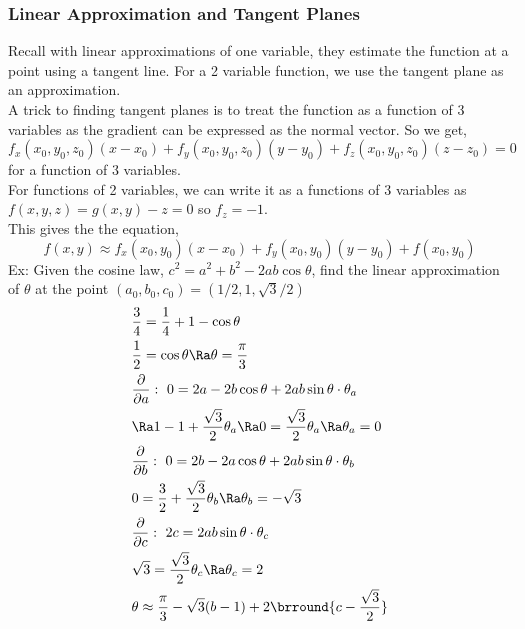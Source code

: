\subsubsection{Linear Approximation and Tangent Planes}
Recall with linear approximations of one variable, they estimate the function at a point using a tangent line. For a 2 variable function, we use the tangent plane as an approximation.\\
A trick to finding tangent planes is to treat the function as a function of 3 variables as the gradient can be expressed as the normal vector. So we get,
$$f_x(x_0,y_0,z_0)(x-x_0)+f_y(x_0,y_0,z_0)(y-y_0)+f_z(x_0,y_0,z_0)(z-z_0)=0$$
for a function of 3 variables.\\
For functions of 2 variables, we can write it as a functions of 3 variables as $f(x,y,z)=g(x,y)-z=0$ so $f_z=-1$.\\
This gives the the equation,
$$f(x,y)\approx f_x(x_0,y_0)(x-x_0)+f_y(x_0,y_0)(y-y_0)+f(x_0,y_0)$$
Ex: Given the cosine law, $c^2=a^2+b^2-2ab\cos\theta$, find the linear approximation of $\theta$ at the point $(a_0,b_0,c_0)=(1/2,1,\sqrt{3}/2)$
\begin{align*}
    &\frac{3}{4}=\frac{1}{4}+1-\cos\theta\\
    &\frac{1}{2}=\cos\theta\Ra \theta=\frac{\pi}{3}\\
    &\frac{\partial}{\partial a}:\ 0=2a-2b\cos\theta+2ab\sin\theta\cdot\theta_a\\
    &\Ra 1-1+\frac{\sqrt{3}}{2}\theta_a\Ra 0=\frac{\sqrt{3}}{2}\theta_a\Ra \theta_a=0\\
    &\frac{\partial}{\partial b}:\ 0=2b-2a\cos\theta+2ab\sin\theta\cdot\theta_b\\
    &0=\frac{3}{2}+\frac{\sqrt{3}}{2}\theta_b\Ra \theta_b=-\sqrt{3}\\
    &\frac{\partial}{\partial c}:\ 2c=2ab\sin\theta\cdot\theta_c\\
    &\sqrt{3}=\frac{\sqrt{3}}{2}\theta_c\Ra \theta_c=2\\
    &\theta\approx\frac{\pi}{3}-\sqrt{3}(b-1)+2\brround{c-\frac{\sqrt{3}}{2}}
\end{align*}

